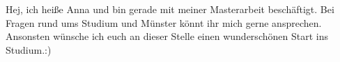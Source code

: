 \begin{multicols}{2}
{
Hej, ich heiße Anna und bin gerade mit meiner Masterarbeit beschäftigt. 
Bei Fragen rund ums Studium und Münster könnt ihr mich gerne ansprechen. 
Ansonsten wünsche ich euch an dieser Stelle einen wunderschönen Start ins Studium.:)
}


\vspace{-0.5cm}


\end{multicols}
